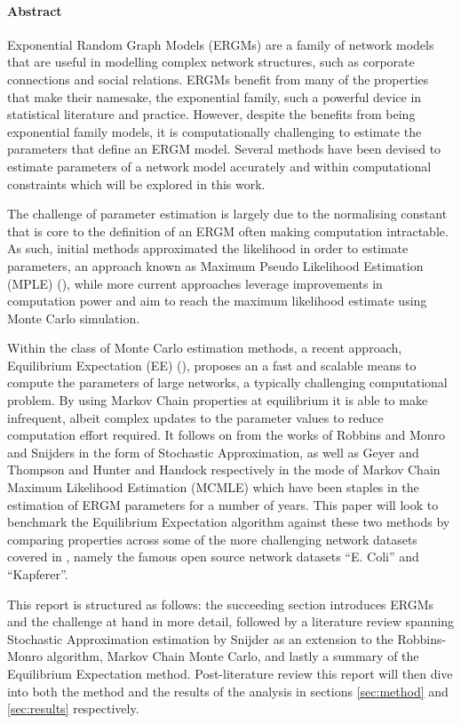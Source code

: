\hspace{0pt}
\vfill
\paragraph{Abstract}

Exponential Random Graph Models (ERGMs) are a family of network models that are useful in modelling complex network structures, such as corporate connections and social relations. ERGMs benefit from many of the properties that make their namesake, the exponential family, such a powerful device in statistical literature and practice. However, despite the benefits from being exponential family models, it is computationally challenging to estimate the parameters that define an ERGM model. Several methods have been devised to estimate parameters of a network model accurately and within computational constraints which will be explored in this work.

The challenge of parameter estimation is largely due to the normalising constant that is core to the definition of an ERGM often making computation intractable. As such, initial methods approximated the likelihood in order to estimate parameters, an approach known as Maximum Pseudo Likelihood Estimation (MPLE) (\cite{straussikeda1990}), while more current approaches leverage improvements in computation power and aim to reach the maximum likelihood estimate using Monte Carlo simulation. 

Within the class of Monte Carlo estimation methods, a recent approach, Equilibrium Expectation (EE) (\cite{eqexpectation}), proposes an a fast and scalable means to compute the parameters of large networks, a typically challenging computational problem. By using Markov Chain properties at equilibrium it is able to make infrequent, albeit complex updates to the parameter values to reduce computation effort required. It follows on from the works of Robbins and Monro and Snijders in the form of Stochastic Approximation, as well as Geyer and Thompson and Hunter and Handock respectively in the mode of Markov Chain Maximum Likelihood Estimation (MCMLE) which have been staples in the estimation of ERGM parameters for a number of years. This paper will look to benchmark the Equilibrium Expectation algorithm against these two methods by comparing properties across some of the more challenging network datasets covered in \cite{hummels2012}, namely the famous open source network datasets ``E. Coli'' and ``Kapferer''. 

This report is structured as follows: the succeeding section introduces ERGMs and the challenge at hand in more detail, followed by a literature review spanning Stochastic Approximation estimation by Snijder as an extension to the Robbins-Monro algorithm, Markov Chain Monte Carlo, and lastly a summary of the Equilibrium Expectation method. Post-literature review this report will then dive into both the method and the results of the analysis in sections \ref{sec:method} and \ref{sec:results} respectively.

\vfill
\hspace{0pt}
